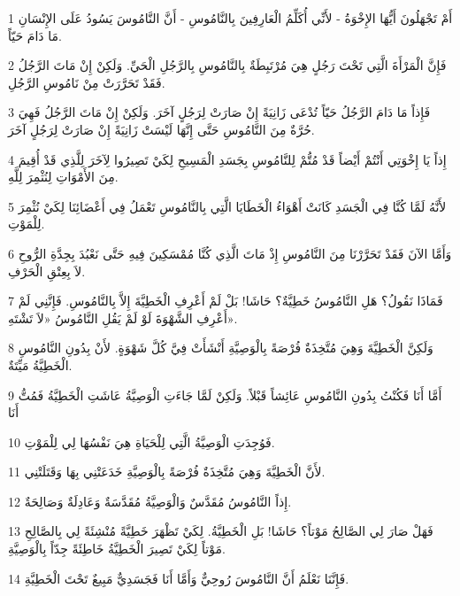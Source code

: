 \par 1 أَمْ تَجْهَلُونَ أَيُّهَا الإِخْوَةُ - لأَنِّي أُكَلِّمُ الْعَارِفِينَ بِالنَّامُوسِ - أَنَّ النَّامُوسَ يَسُودُ عَلَى الإِنْسَانِ مَا دَامَ حَيّاً.
\par 2 فَإِنَّ الْمَرْأَةَ الَّتِي تَحْتَ رَجُلٍ هِيَ مُرْتَبِطَةٌ بِالنَّامُوسِ بِالرَّجُلِ الْحَيِّ. وَلَكِنْ إِنْ مَاتَ الرَّجُلُ فَقَدْ تَحَرَّرَتْ مِنْ نَامُوسِ الرَّجُلِ.
\par 3 فَإِذاً مَا دَامَ الرَّجُلُ حَيّاً تُدْعَى زَانِيَةً إِنْ صَارَتْ لِرَجُلٍ آخَرَ. وَلَكِنْ إِنْ مَاتَ الرَّجُلُ فَهِيَ حُرَّةٌ مِنَ النَّامُوسِ حَتَّى إِنَّهَا لَيْسَتْ زَانِيَةً إِنْ صَارَتْ لِرَجُلٍ آخَرَ.
\par 4 إِذاً يَا إِخْوَتِي أَنْتُمْ أَيْضاً قَدْ مُتُّمْ لِلنَّامُوسِ بِجَسَدِ الْمَسِيحِ لِكَيْ تَصِيرُوا لِآخَرَ لِلَّذِي قَدْ أُقِيمَ مِنَ الأَمْوَاتِ لِنُثْمِرَ لِلَّهِ.
\par 5 لأَنَّهُ لَمَّا كُنَّا فِي الْجَسَدِ كَانَتْ أَهْوَاءُ الْخَطَايَا الَّتِي بِالنَّامُوسِ تَعْمَلُ فِي أَعْضَائِنَا لِكَيْ نُثْمِرَ لِلْمَوْتِ.
\par 6 وَأَمَّا الآنَ فَقَدْ تَحَرَّرْنَا مِنَ النَّامُوسِ إِذْ مَاتَ الَّذِي كُنَّا مُمْسَكِينَ فِيهِ حَتَّى نَعْبُدَ بِجِدَّةِ الرُّوحِ لاَ بِعِتْقِ الْحَرْفِ.
\par 7 فَمَاذَا نَقُولُ؟ هَلِ النَّامُوسُ خَطِيَّةٌ؟ حَاشَا! بَلْ لَمْ أَعْرِفِ الْخَطِيَّةَ إِلاَّ بِالنَّامُوسِ. فَإِنَّنِي لَمْ أَعْرِفِ الشَّهْوَةَ لَوْ لَمْ يَقُلِ النَّامُوسُ «لاَ تَشْتَهِ».
\par 8 وَلَكِنَّ الْخَطِيَّةَ وَهِيَ مُتَّخِذَةٌ فُرْصَةً بِالْوَصِيَّةِ أَنْشَأَتْ فِيَّ كُلَّ شَهْوَةٍ. لأَنْ بِدُونِ النَّامُوسِ الْخَطِيَّةُ مَيِّتَةٌ.
\par 9 أَمَّا أَنَا فَكُنْتُ بِدُونِ النَّامُوسِ عَائِشاً قَبْلاً. وَلَكِنْ لَمَّا جَاءَتِ الْوَصِيَّةُ عَاشَتِ الْخَطِيَّةُ فَمُتُّ أَنَا
\par 10 فَوُجِدَتِ الْوَصِيَّةُ الَّتِي لِلْحَيَاةِ هِيَ نَفْسُهَا لِي لِلْمَوْتِ.
\par 11 لأَنَّ الْخَطِيَّةَ وَهِيَ مُتَّخِذَةٌ فُرْصَةً بِالْوَصِيَّةِ خَدَعَتْنِي بِهَا وَقَتَلَتْنِي.
\par 12 إِذاً النَّامُوسُ مُقَدَّسٌ وَالْوَصِيَّةُ مُقَدَّسَةٌ وَعَادِلَةٌ وَصَالِحَةٌ.
\par 13 فَهَلْ صَارَ لِي الصَّالِحُ مَوْتاً؟ حَاشَا! بَلِ الْخَطِيَّةُ. لِكَيْ تَظْهَرَ خَطِيَّةً مُنْشِئَةً لِي بِالصَّالِحِ مَوْتاً لِكَيْ تَصِيرَ الْخَطِيَّةُ خَاطِئَةً جِدّاً بِالْوَصِيَّةِ.
\par 14 فَإِنَّنَا نَعْلَمُ أَنَّ النَّامُوسَ رُوحِيٌّ وَأَمَّا أَنَا فَجَسَدِيٌّ مَبِيعٌ تَحْتَ الْخَطِيَّةِ.
